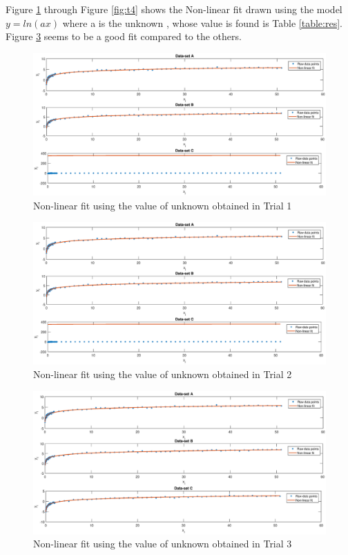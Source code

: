 \documentclass{article}
\begin{document}
\noindent
Figure \ref{fig:t1} through Figure \ref{fig:t4} shows the Non-linear fit drawn using the model $y=ln(ax)$ where a is the unknown , whose value is found is Table \ref{table:res}. Figure \ref{fig:t3} seems to be a good fit compared to the others. 

\begin{figure}
\centering
	\includegraphics[width=\textwidth]{Trial2.eps}
	\caption{Non-linear fit using the value of unknown obtained in Trial 1}
	\label{fig:t1}
\end{figure}
\begin{figure}
\centering
	\includegraphics[width=\textwidth]{Trial2.eps}
	\caption{Non-linear fit using the value of unknown obtained in Trial 2}
	\label{fig:t2}
\end{figure}
\begin{figure}
\centering
	\includegraphics[width=\textwidth]{Trial3.eps}
	\caption{Non-linear fit using the value of unknown obtained in Trial 3}
	\label{fig:t3}
\end{figure}
\end{document}
